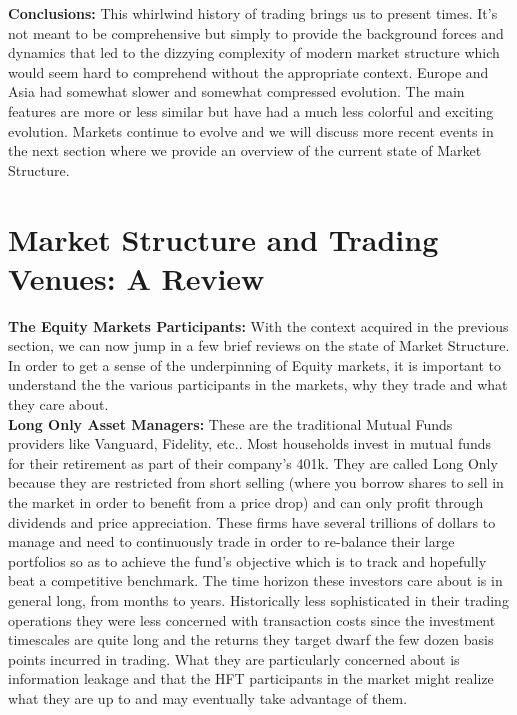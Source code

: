 \noindent\textbf{Conclusions:} This whirlwind history of trading brings us to present times. It's not meant to be comprehensive but simply to provide the background forces and dynamics that led to the dizzying complexity of modern market structure which would seem hard to comprehend without the appropriate context. 
Europe and Asia had somewhat slower and somewhat compressed evolution. The main features are more or less similar but have had a much less colorful and exciting evolution. Markets continue to evolve and we will discuss more recent events in the next section where we provide an overview of the current state of Market Structure.



\section{Market Structure and Trading Venues: A Review}


\noindent\textbf{The Equity Markets Participants:} With the context acquired in the previous section, we can now jump in a few brief reviews on the state of Market Structure. In order to get a sense of the underpinning of Equity markets, it is important to understand the the various participants in the markets, why they trade and what they care about. \\


\noindent\textbf{Long Only Asset Managers:} These are the traditional Mutual Funds providers like Vanguard, Fidelity, etc.. Most households invest in mutual funds for their retirement as part of their company's 401k. They are called Long Only because they are restricted from short selling (where you borrow shares to sell in the market in order to benefit from a price drop) and can only profit through dividends and price appreciation. These firms have several trillions of dollars to manage and need to continuously trade in order to re-balance their large portfolios so as to achieve the fund's objective which is to track and hopefully beat a competitive benchmark. The time horizon these investors care about is in general long, from months to years. Historically less sophisticated in their trading operations they were less concerned with transaction costs since the investment timescales are quite long and the returns they target dwarf the few dozen basis points incurred in trading.  What they are particularly concerned about is information leakage and that the HFT participants in the market might realize what they are up to and may eventually take advantage of them. \\


